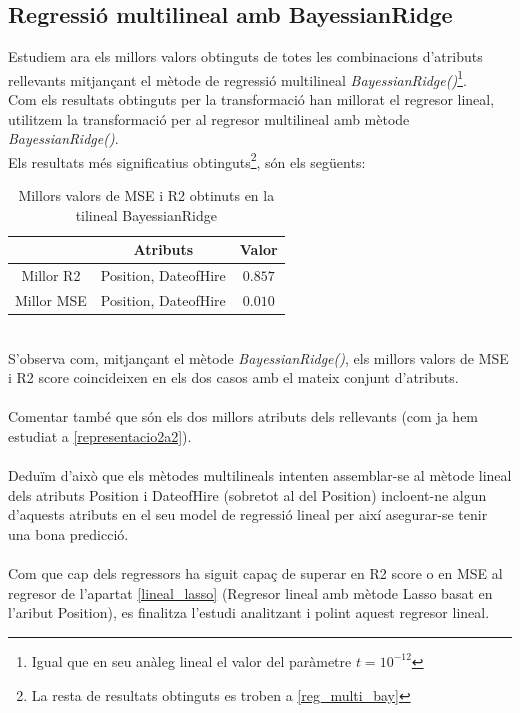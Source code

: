\documentclass[a4paper, 11pt]{article}
\begin{document}
\subsection{Regressió multilineal amb BayessianRidge}
Estudiem ara els millors valors obtinguts de totes les combinacions d'atributs rellevants mitjançant el mètode de regressió multilineal \textit{BayessianRidge()}\footnote{Igual que en seu anàleg lineal el valor del paràmetre $t = 10^{-12}$}.\\
Com els resultats obtinguts per la transformació han millorat el regresor lineal, utilitzem la transformació per al regresor multilineal amb mètode \textit{BayessianRidge()}.
\\
Els resultats més significatius obtinguts\footnote{La resta de resultats obtinguts es troben a \textcolor{blue}{\ref{reg_multi_bay}}}, són els següents:
\begin{table}[h]
    \centering
    \begin{tabular}{c||c|c}
        \cellcolor{white}{} & Atributs & Valor \\ \hline \hline
        Millor R2 & Position, DateofHire & $0.857$ \\ \hline
        Millor MSE & Position, DateofHire & $0.010$
    \end{tabular}
    \caption{Millors valors de MSE i R2 obtinuts en la tilineal BayessianRidge}
    \label{tab:my_label}
\end{table}\\
S'observa com, mitjançant el mètode \textit{BayessianRidge()}, els millors valors de MSE i R2 score coincideixen en els dos casos amb el mateix conjunt d'atributs.\\\\
Comentar també que són els dos millors atributs dels rellevants (com ja hem estudiat a \textcolor{blue}{\ref{representacio2a2}}).\\\\
Deduïm d'això que els mètodes multilineals intenten assemblar-se al mètode lineal dels atributs Position i DateofHire (sobretot al del Position) incloent-ne algun d'aquests atributs en el seu model de regressió lineal per així asegurar-se tenir una bona predicció.\\\\
Com que cap dels regressors ha siguit capaç de superar en R2 score o en MSE al regresor de l'apartat \textcolor{blue}{\ref{lineal_lasso}} (Regresor lineal amb mètode Lasso basat en l'aribut Position), es finalitza l'estudi analitzant i polint aquest regresor lineal.
\newpage
\end{document}
